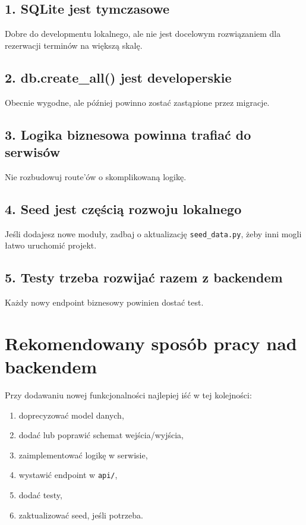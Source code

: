 \documentclass[11pt,a4paper]{article}
\begin{document}
\subsection{1. SQLite jest tymczasowe}
Dobre do developmentu lokalnego, ale nie jest docelowym rozwiązaniem dla rezerwacji terminów na większą skalę.

\subsection{2. db.create\_all() jest developerskie}
Obecnie wygodne, ale później powinno zostać zastąpione przez migracje.

\subsection{3. Logika biznesowa powinna trafiać do serwisów}
Nie rozbudowuj route'ów o skomplikowaną logikę.

\subsection{4. Seed jest częścią rozwoju lokalnego}
Jeśli dodajesz nowe moduły, zadbaj o aktualizację \texttt{seed\_data.py}, żeby inni mogli łatwo uruchomić projekt.

\subsection{5. Testy trzeba rozwijać razem z backendem}
Każdy nowy endpoint biznesowy powinien dostać test.

\section{Rekomendowany sposób pracy nad backendem}

Przy dodawaniu nowej funkcjonalności najlepiej iść w tej kolejności:
\begin{enumerate}[leftmargin=1.2cm]
    \item doprecyzować model danych,
    \item dodać lub poprawić schemat wejścia/wyjścia,
    \item zaimplementować logikę w serwisie,
    \item wystawić endpoint w \texttt{api/},
    \item dodać testy,
    \item zaktualizować seed, jeśli potrzeba.
\end{enumerate}
\end{document}
